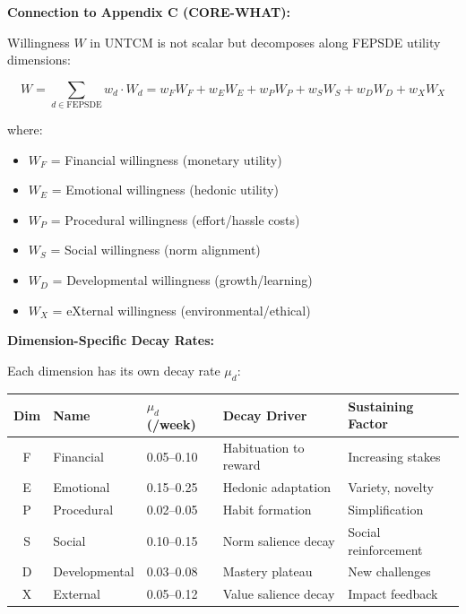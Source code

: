 \begin{tcolorbox}[colback=purple!5!white, colframe=purple!75!black,
    title=\textbf{Integration UNTCM-I3: FEPSDE Utility Decomposition}]

\textbf{Connection to Appendix C (CORE-WHAT):}

Willingness $W$ in UNTCM is not scalar but decomposes along FEPSDE utility dimensions:

\begin{equation}
\boxed{
W = \sum_{d \in \text{FEPSDE}} w_d \cdot W_d = w_F W_F + w_E W_E + w_P W_P + w_S W_S + w_D W_D + w_X W_X
}
\label{eq:W-fepsde}
\end{equation}

where:
\begin{itemize}[nosep]
\item $W_F$ = Financial willingness (monetary utility)
\item $W_E$ = Emotional willingness (hedonic utility)
\item $W_P$ = Procedural willingness (effort/hassle costs)
\item $W_S$ = Social willingness (norm alignment)
\item $W_D$ = Developmental willingness (growth/learning)
\item $W_X$ = eXternal willingness (environmental/ethical)
\end{itemize}

\textbf{Dimension-Specific Decay Rates:}

Each dimension has its own decay rate $\mu_d$:

\begin{center}
\renewcommand{\arraystretch}{1.2}
\begin{tabular}{@{}cllll@{}}
\toprule
\textbf{Dim} & \textbf{Name} & \textbf{$\mu_d$ (/week)} & \textbf{Decay Driver} & \textbf{Sustaining Factor} \\
\midrule
F & Financial & 0.05--0.10 & Habituation to reward & Increasing stakes \\
E & Emotional & 0.15--0.25 & Hedonic adaptation & Variety, novelty \\
P & Procedural & 0.02--0.05 & Habit formation & Simplification \\
S & Social & 0.10--0.15 & Norm salience decay & Social reinforcement \\
D & Developmental & 0.03--0.08 & Mastery plateau & New challenges \\
X & External & 0.05--0.12 & Value salience decay & Impact feedback \\
\bottomrule
\end{tabular}
\end{center}


\end{tcolorbox}
